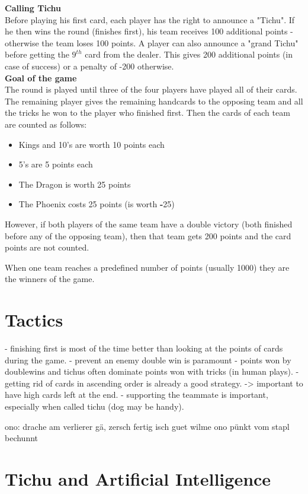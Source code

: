 \noindent\textbf{Calling Tichu}\\
Before playing his first card, each player has the right to announce a "Tichu". If he then wins the round (finishes first), his team receives 100 additional points - otherwise the team loses 100 points.
A player can also announce a "grand Tichu" before getting the $9^{th}$ card from the dealer. This gives 200 additional points (in case of success) or a penalty of -200 otherwise.\\

\noindent\textbf{Goal of the game}\\
The round is played until three of the four players have played all of their cards.
The remaining player gives the remaining handcards to the opposing team and all the tricks he won to the player who finished first.
Then the cards of each team are counted as follows:
\begin{itemize}
    \item Kings and 10's are worth 10 points each
    \item 5's are 5 points each
    \item The Dragon is worth 25 points
    \item The Phoenix costs 25 points (is worth \textbf{-}25)
\end{itemize}

\noindent However, if both players of the same team have a double victory (both finished before any of the opposing team), then that team gets 200 points and the card points are not counted.

\noindent When one team reaches a predefined number of points (usually 1000) they are the winners of the game.


\section{Tactics}
\label{sec:tactics}
- finishing first is most of the time better than looking at the points of cards during the game.
- prevent an enemy double win is paramount
- points won by doublewins and tichus often dominate points won with tricks (in human plays).
- getting rid of cards in ascending order is already a good strategy.
-> important to have high cards left at the end.
- supporting the teammate is important, especially when called tichu (dog may be handy).

ono: drache am verlierer gä, zersch fertig isch guet wilme ono pünkt vom stapl bechunnt

\section{Tichu and Artificial Intelligence}


